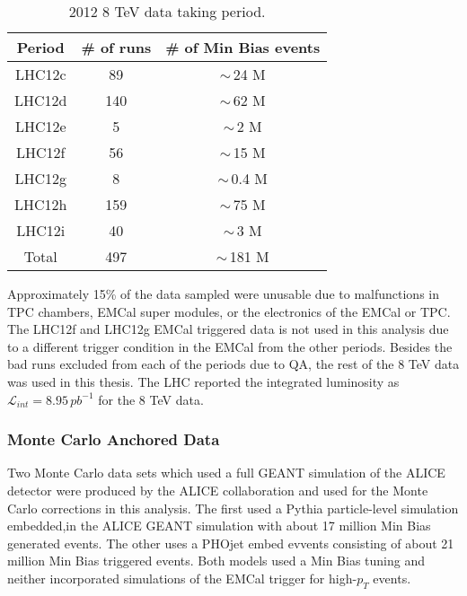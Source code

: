 \begin{table}[hb]
\label{tab:RunSummary}
\begin{center}
\caption{2012 8 TeV data taking period.}
\begin{tabular}[b]{|c|c|c|}
	\hline
	Period & \# of runs & \# of Min Bias events \\ \hline
	LHC12c & 89 & $\sim \,$24 M \\ \hline
	LHC12d & 140 & $\sim \,$62 M \\ \hline
	LHC12e & 5 & $\sim \,$2 M \\ \hline
	LHC12f & 56 & $\sim \,$15 M \\ \hline
	LHC12g & 8 & $\sim \,$0.4 M \\ \hline
	LHC12h & 159 & $\sim \,$75 M \\ \hline
	LHC12i & 40 & $\sim \,$3 M \\ \hline
	Total & 497 & $\sim \,$181 M \\ \hline

\end{tabular}
\end{center}

\end{table}

Approximately 15\% of the data sampled were unusable due to malfunctions in TPC chambers, EMCal super modules, or the electronics of the EMCal or TPC.  The LHC12f and LHC12g EMCal triggered data is not used in this analysis due to a different trigger condition in the EMCal from the other periods.  Besides the bad runs excluded from each of the periods due to QA, the rest of the 8 TeV data was used in this thesis.  The LHC reported the integrated luminosity as $\mathscr{L}_{int} = 8.95 \, pb^{-1}$ for the 8 TeV data\cite{ALICE-PUBLIC-2017-002}.

\subsubsection{Monte Carlo Anchored Data}
Two Monte Carlo data sets which used a full GEANT simulation of the ALICE detector were produced by the ALICE collaboration and used for the Monte Carlo corrections in this analysis.   The first used a Pythia particle-level simulation embedded,in the ALICE GEANT simulation with about 17 million Min Bias generated events. The other uses a PHOjet embed evvents consisting of about 21 million Min Bias triggered events.  Both models used a Min Bias tuning and neither incorporated simulations of the EMCal trigger for high-$p_{T}$ events.

